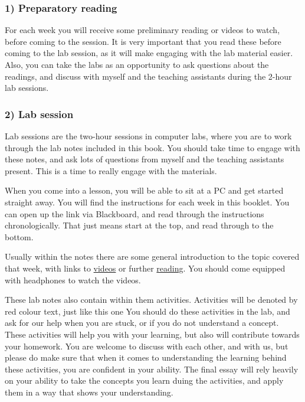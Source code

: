 \documentclass[]{book}
\theoremstyle{definition}
\theoremstyle{definition}
\theoremstyle{definition}
\theoremstyle{remark}
\begin{document}
\hypertarget{preparatory-reading}{%
\subsubsection{1) Preparatory reading}\label{preparatory-reading}}

For each week you will receive some preliminary reading or videos to
watch, before coming to the session. It is very important that you read
these before coming to the lab session, as it will make engaging with
the lab material easier. Also, you can take the labs as an opportunity
to ask questions about the readings, and discuss with myself and the
teaching assistants during the 2-hour lab sessions.

\hypertarget{lab-session}{%
\subsubsection{2) Lab session}\label{lab-session}}

Lab sessions are the two-hour sessions in computer labs, where you are
to work through the lab notes included in this book. You should take
time to engage with these notes, and ask lots of questions from myself
and the teaching assistants present. This is a time to really engage
with the materials.

When you come into a lesson, you will be able to sit at a PC and get
started straight away. You will find the instructions for each week in
this booklet. You can open up the link via Blackboard, and read through
the instructions chronologically. That just means start at the top, and
read through to the bottom.

Usually within the notes there are some general introduction to the
topic covered that week, with links to
\href{http://www.gapminder.org/videos/the-joy-of-stats/}{videos} or
further
\href{http://flowingdata.com/2015/10/26/top-brewery-road-trip-routed-algorithmically/}{reading}.
You should come equipped with headphones to watch the videos.

These lab notes also contain within them activities. {Activities will be
denoted by red colour text, just like this one } You should do these
activities in the lab, and ask for our help when you are stuck, or if
you do not understand a concept. These activities will help you with
your learning, but also will contribute towards your homework. You are
welcome to discuss with each other, and with us, but please do make sure
that when it comes to understanding the learning behind these
activities, you are confident in your ability. The final essay will rely
heavily on your ability to take the concepts you learn duing the
activities, and apply them in a way that shows your understanding.
\end{document}
